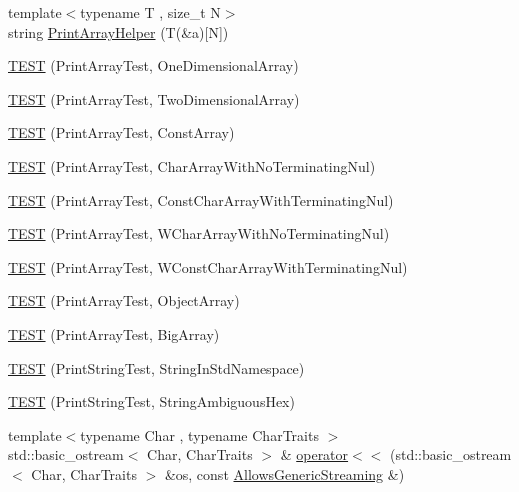 \begin{DoxyCompactItemize}
\item 
{\footnotesize template$<$typename T , size\+\_\+t N$>$ }\\string \hyperlink{namespacetesting_1_1gtest__printers__test_a10300ded1e327c98c6a36beb7ad49e58}{Print\+Array\+Helper} (T(\&a)\mbox{[}N\mbox{]})
\item 
\hyperlink{namespacetesting_1_1gtest__printers__test_a3845c4717b03cb5ad309c7d9a37acb0a}{T\+E\+S\+T} (Print\+Array\+Test, One\+Dimensional\+Array)
\item 
\hyperlink{namespacetesting_1_1gtest__printers__test_ac366b9ec749b2499d21583d3b8f86273}{T\+E\+S\+T} (Print\+Array\+Test, Two\+Dimensional\+Array)
\item 
\hyperlink{namespacetesting_1_1gtest__printers__test_a8b5638f178c12f58707ca0f02a3b4d41}{T\+E\+S\+T} (Print\+Array\+Test, Const\+Array)
\item 
\hyperlink{namespacetesting_1_1gtest__printers__test_a3bae023a42049745b49fa1f2db9a0cb2}{T\+E\+S\+T} (Print\+Array\+Test, Char\+Array\+With\+No\+Terminating\+Nul)
\item 
\hyperlink{namespacetesting_1_1gtest__printers__test_ab51b9ecaca7d635326101b23d5e8afd2}{T\+E\+S\+T} (Print\+Array\+Test, Const\+Char\+Array\+With\+Terminating\+Nul)
\item 
\hyperlink{namespacetesting_1_1gtest__printers__test_ac19ec2732031bfe83b30ea9f00259ef3}{T\+E\+S\+T} (Print\+Array\+Test, W\+Char\+Array\+With\+No\+Terminating\+Nul)
\item 
\hyperlink{namespacetesting_1_1gtest__printers__test_a6a7cbcdbe748a1d4e90658f48f36c9da}{T\+E\+S\+T} (Print\+Array\+Test, W\+Const\+Char\+Array\+With\+Terminating\+Nul)
\item 
\hyperlink{namespacetesting_1_1gtest__printers__test_af91d8ad9d6c7547913fe05c7acc44114}{T\+E\+S\+T} (Print\+Array\+Test, Object\+Array)
\item 
\hyperlink{namespacetesting_1_1gtest__printers__test_a596493b56489aa1571fa26d1402e7116}{T\+E\+S\+T} (Print\+Array\+Test, Big\+Array)
\item 
\hyperlink{namespacetesting_1_1gtest__printers__test_abbd355e76033f0defd76c37523ad0f60}{T\+E\+S\+T} (Print\+String\+Test, String\+In\+Std\+Namespace)
\item 
\hyperlink{namespacetesting_1_1gtest__printers__test_ac20ee165500471e363011c3f664d2fb8}{T\+E\+S\+T} (Print\+String\+Test, String\+Ambiguous\+Hex)
\item 
{\footnotesize template$<$typename Char , typename Char\+Traits $>$ }\\std\+::basic\+\_\+ostream$<$ Char, Char\+Traits $>$ \& \hyperlink{namespacetesting_1_1gtest__printers__test_a1eb0213095e639d357692066e8505887}{operator$<$$<$} (std\+::basic\+\_\+ostream$<$ Char, Char\+Traits $>$ \&os, const \hyperlink{classtesting_1_1gtest__printers__test_1_1_allows_generic_streaming}{Allows\+Generic\+Streaming} \&)

\end{DoxyCompactItemize}
